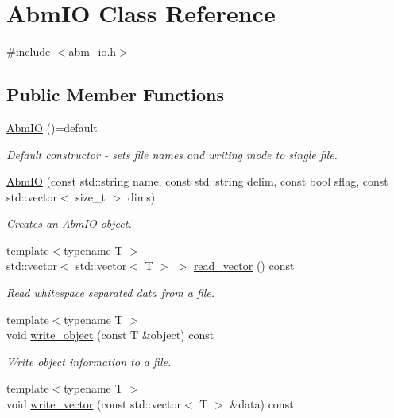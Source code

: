 \hypertarget{classAbmIO}{}\section{Abm\+IO Class Reference}
\label{classAbmIO}


{\ttfamily \#include $<$abm\+\_\+io.\+h$>$}

\subsection*{Public Member Functions}
\begin{DoxyCompactItemize}
\item 
\hyperlink{classAbmIO_abe7ea84f8ad3a29b664a03343b058dde}{Abm\+IO} ()=default
\begin{DoxyCompactList}\small\item\em Default constructor -\/ sets file names and writing mode to single file. \end{DoxyCompactList}\item 
\hyperlink{classAbmIO_a2aa3f0c48d1d213d9b6e615f5664ff3e}{Abm\+IO} (const std\+::string name, const std\+::string delim, const bool sflag, const std\+::vector$<$ size\+\_\+t $>$ dims)
\begin{DoxyCompactList}\small\item\em Creates an \hyperlink{classAbmIO}{Abm\+IO} object. \end{DoxyCompactList}\item 
{\footnotesize template$<$typename T $>$ }\\std\+::vector$<$ std\+::vector$<$ T $>$ $>$ \hyperlink{classAbmIO_aab72a672f5e932cd46443672fc9cdfd8}{read\+\_\+vector} () const
\begin{DoxyCompactList}\small\item\em Read whitespace separated data from a file. \end{DoxyCompactList}\item 
{\footnotesize template$<$typename T $>$ }\\void \hyperlink{classAbmIO_a18d9fb3dfa9b074943e1c9e708dfe56d}{write\+\_\+object} (const T \&object) const
\begin{DoxyCompactList}\small\item\em Write object information to a file. \end{DoxyCompactList}\item 
{\footnotesize template$<$typename T $>$ }\\void \hyperlink{classAbmIO_a0cd34d6379af33faca512b82f8743a19}{write\+\_\+vector} (const std\+::vector$<$ T $>$ \&data) const

\end{DoxyCompactItemize}
